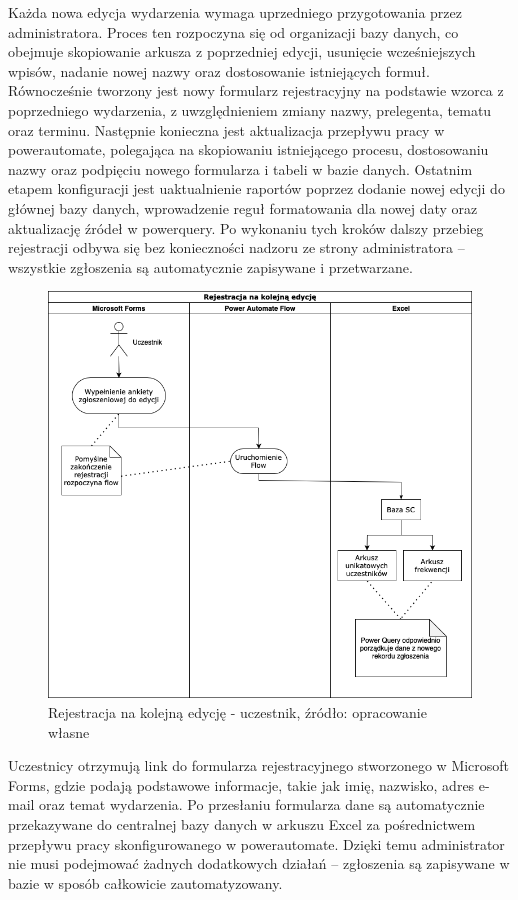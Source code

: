 Każda nowa edycja wydarzenia wymaga uprzedniego przygotowania przez administratora. Proces ten rozpoczyna się od organizacji bazy danych, co obejmuje skopiowanie arkusza z poprzedniej edycji, usunięcie wcześniejszych wpisów, nadanie nowej nazwy oraz dostosowanie istniejących formuł. Równocześnie tworzony jest nowy formularz rejestracyjny na podstawie wzorca z poprzedniego wydarzenia, z uwzględnieniem zmiany nazwy, prelegenta, tematu oraz terminu. Następnie konieczna jest aktualizacja przepływu pracy w \gls{powerautomate}, polegająca na skopiowaniu istniejącego procesu, dostosowaniu nazwy oraz podpięciu nowego formularza i tabeli w bazie danych. Ostatnim etapem konfiguracji jest uaktualnienie raportów poprzez dodanie nowej edycji do głównej bazy danych, wprowadzenie reguł formatowania dla nowej daty oraz aktualizację źródeł w \gls{powerquery}. Po wykonaniu tych kroków dalszy przebieg rejestracji odbywa się bez konieczności nadzoru ze strony administratora – wszystkie zgłoszenia są automatycznie zapisywane i przetwarzane.

\begin{figure}[!hb]
	\centering \includegraphics[width=0.85\linewidth]{rysunki/registration.png}
	\caption{Rejestracja na kolejną edycję - uczestnik, źródło: opracowanie własne}
\end{figure}

Uczestnicy otrzymują link do formularza rejestracyjnego stworzonego w Microsoft Forms, gdzie podają podstawowe informacje, takie jak imię, nazwisko, adres e-mail oraz temat wydarzenia. Po przesłaniu formularza dane są automatycznie przekazywane do centralnej bazy danych w arkuszu Excel za pośrednictwem przepływu pracy skonfigurowanego w \gls{powerautomate}. Dzięki temu administrator nie musi podejmować żadnych dodatkowych działań – zgłoszenia są zapisywane w bazie w sposób całkowicie zautomatyzowany.

